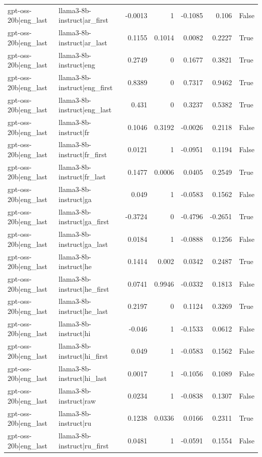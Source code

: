 \begin{table}
\begin{tabular}{l l r r r r l}
gpt-oss-20b|eng_last & llama3-8b-instruct|ar_first & -0.0013 & 1 & -0.1085 & 0.106 & False \\
gpt-oss-20b|eng_last & llama3-8b-instruct|ar_last & 0.1155 & 0.1014 & 0.0082 & 0.2227 & True \\
gpt-oss-20b|eng_last & llama3-8b-instruct|eng & 0.2749 & 0 & 0.1677 & 0.3821 & True \\
gpt-oss-20b|eng_last & llama3-8b-instruct|eng_first & 0.8389 & 0 & 0.7317 & 0.9462 & True \\
gpt-oss-20b|eng_last & llama3-8b-instruct|eng_last & 0.431 & 0 & 0.3237 & 0.5382 & True \\
gpt-oss-20b|eng_last & llama3-8b-instruct|fr & 0.1046 & 0.3192 & -0.0026 & 0.2118 & False \\
gpt-oss-20b|eng_last & llama3-8b-instruct|fr_first & 0.0121 & 1 & -0.0951 & 0.1194 & False \\
gpt-oss-20b|eng_last & llama3-8b-instruct|fr_last & 0.1477 & 0.0006 & 0.0405 & 0.2549 & True \\
gpt-oss-20b|eng_last & llama3-8b-instruct|ga & 0.049 & 1 & -0.0583 & 0.1562 & False \\
gpt-oss-20b|eng_last & llama3-8b-instruct|ga_first & -0.3724 & 0 & -0.4796 & -0.2651 & True \\
gpt-oss-20b|eng_last & llama3-8b-instruct|ga_last & 0.0184 & 1 & -0.0888 & 0.1256 & False \\
gpt-oss-20b|eng_last & llama3-8b-instruct|he & 0.1414 & 0.002 & 0.0342 & 0.2487 & True \\
gpt-oss-20b|eng_last & llama3-8b-instruct|he_first & 0.0741 & 0.9946 & -0.0332 & 0.1813 & False \\
gpt-oss-20b|eng_last & llama3-8b-instruct|he_last & 0.2197 & 0 & 0.1124 & 0.3269 & True \\
gpt-oss-20b|eng_last & llama3-8b-instruct|hi & -0.046 & 1 & -0.1533 & 0.0612 & False \\
gpt-oss-20b|eng_last & llama3-8b-instruct|hi_first & 0.049 & 1 & -0.0583 & 0.1562 & False \\
gpt-oss-20b|eng_last & llama3-8b-instruct|hi_last & 0.0017 & 1 & -0.1056 & 0.1089 & False \\
gpt-oss-20b|eng_last & llama3-8b-instruct|raw & 0.0234 & 1 & -0.0838 & 0.1307 & False \\
gpt-oss-20b|eng_last & llama3-8b-instruct|ru & 0.1238 & 0.0336 & 0.0166 & 0.2311 & True \\
gpt-oss-20b|eng_last & llama3-8b-instruct|ru_first & 0.0481 & 1 & -0.0591 & 0.1554 & False \\

\end{tabular}
\end{table}
